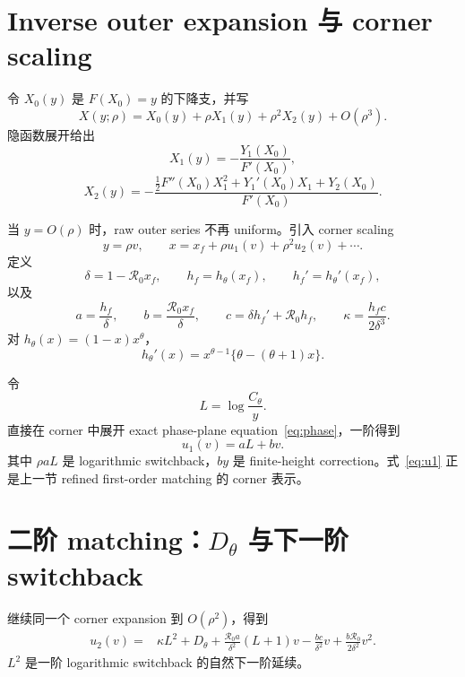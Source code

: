 \documentclass[11pt,a4paper]{ctexart}
\newcommand{\Rzero}{\mathcal R_0}
\newcommand{\xf}{x_f}
\begin{document}
\section{Inverse outer expansion 与 corner scaling}
令 $X_0(y)$ 是 $F(X_0)=y$ 的下降支，并写
\begin{equation}
\label{eq:Xexp}
X(y;\rho)=X_0(y)+\rho X_1(y)+\rho^2X_2(y)+O(\rho^3).
\end{equation}
隐函数展开给出
\begin{equation}
\label{eq:X1}
X_1(y)=-\frac{Y_1(X_0)}{F'(X_0)},
\end{equation}
\begin{equation}
\label{eq:X2}
X_2(y)
=-\frac{\frac12F''(X_0)X_1^2+Y_1'(X_0)X_1+Y_2(X_0)}{F'(X_0)}.
\end{equation}

当 $y=O(\rho)$ 时，raw outer series 不再 uniform。引入 corner scaling
\begin{equation}
\label{eq:corner_scale}
y=\rho v,
\qquad
x=\xf+\rho u_1(v)+\rho^2u_2(v)+\cdots.
\end{equation}
定义
\begin{equation}
\label{eq:abcd}
\delta=1-\Rzero\xf,
\qquad
h_f=h_\theta(\xf),
\qquad
h_f'=h_\theta'(\xf),
\end{equation}
以及
\begin{equation}
\label{eq:abc2}
a=\frac{h_f}{\delta},
\qquad
b=\frac{\Rzero\xf}{\delta},
\qquad
c=\delta h_f'+\Rzero h_f,
\qquad
\kappa=\frac{h_fc}{2\delta^3}.
\end{equation}
对 $h_\theta(x)=(1-x)x^\theta$，
\[
h_\theta'(x)=x^{\theta-1}\{\theta-(\theta+1)x\}.
\]

令
\begin{equation}
\label{eq:L}
L=\log\frac{C_\theta}{y}.
\end{equation}
直接在 corner 中展开 exact phase-plane equation~\eqref{eq:phase}，一阶得到
\begin{equation}
\label{eq:u1}
u_1(v)=aL+bv.
\end{equation}
其中 $\rho aL$ 是 logarithmic switchback，$by$ 是 finite-height correction。式~\eqref{eq:u1} 正是上一节 refined first-order matching 的 corner 表示。

\section{二阶 matching：$D_\theta$ 与下一阶 switchback}
继续同一个 corner expansion 到 $O(\rho^2)$，得到
\begin{equation}
\label{eq:u2}
\begin{split}
u_2(v)={}&\kappa L^2+D_\theta
+\frac{\Rzero a}{\delta^2}(L+1)v
-\frac{bc}{\delta^2}v
+\frac{b\Rzero}{2\delta^2}v^2.
\end{split}
\end{equation}
$L^2$ 是一阶 logarithmic switchback 的自然下一阶延续。
\end{document}
